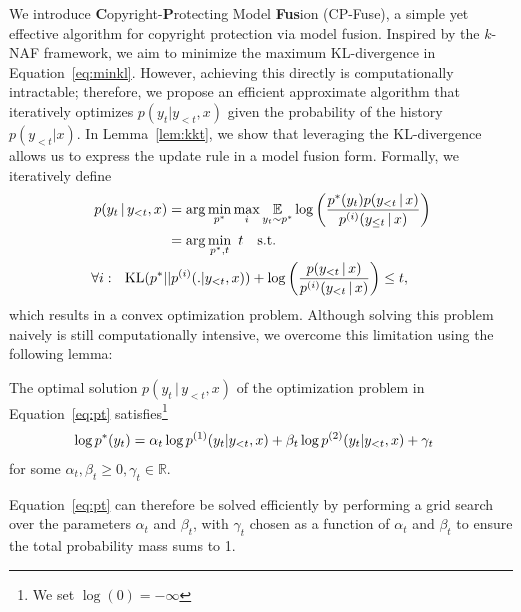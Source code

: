 We introduce \textbf{C}opyright-\textbf{P}rotecting Model \textbf{Fus}ion (CP-Fuse), a simple yet effective algorithm for copyright protection via model fusion. Inspired by the $k$-NAF framework, we aim to minimize the maximum KL-divergence in Equation~\eqref{eq:minkl}. However, achieving this directly is computationally intractable; therefore, we propose an efficient approximate algorithm that iteratively optimizes $p(y_{t} | y_{<t}, x )$ given the probability of the history $p(y_{<t} | x )$. In Lemma~\ref{lem:kkt}, we show that leveraging the KL-divergence allows us to express the update rule in a model fusion form. Formally, we iteratively define
\begin{equation}
\label{eq:pt}
    \begin{aligned}
        p(y_t \, | \, y_{<t}, x) &= \arg\min_{p^*} \max_i \underset{y_t \sim p^*}{\mathbb{E}} \log\left( \frac{p^*(y_t) p(y_{<t} \, | \, x)}{p^{(i)}(y_{\leq t} \, | \, x)} \right)\\
            &=\arg\min_{p^* , t} ~t \quad \text{s.t.}~~\\ \forall i: ~~ \text{KL}( p^*\vert &\vert p^{(i)}(. \vert y_{<t}, x) ) + \log\left(\frac{p(y_{<t} \, | \, x)}{p^{(i)}(y_{< t} \, | \, x)} \right) \leq t,
    \end{aligned}
\end{equation}
which results in a convex optimization problem. Although solving this problem naively is still computationally intensive, we overcome this limitation using the following lemma:
\begin{lemma}
\label{lem:kkt}
The optimal solution \(  p(y_t \, | \, y_{<t}, x)\) of the optimization problem in Equation~\eqref{eq:pt} satisfies\footnote{We set \(\log(0) = - \infty\)}
\begin{equation}
    \begin{aligned}
    \log p^*(y_t) &= \alpha_t \log p^{(1)}(y_t | y_{<t}, x)  + \beta_t \log p^{(2)}(y_t | y_{<t}, x) + \gamma_t
    \end{aligned}
\label{eq:opt}
\end{equation}
for some \(\alpha_t, \beta_t \geq 0, \gamma_t \in \mathbb{R}\).
\end{lemma}
Equation~\eqref{eq:pt} can therefore be solved efficiently by performing a grid search over the parameters \(\alpha_t\) and \(\beta_t\), with \(\gamma_t\) chosen as a function of \(\alpha_t\) and \(\beta_t\) to ensure the total probability mass sums to 1.


